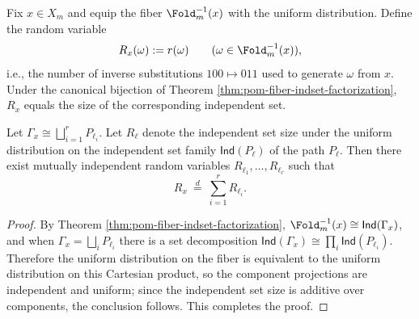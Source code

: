 \begin{definition}\label{def:pom-fiber-rewrite-rv}
Fix \(x\in X_m\) and equip the fiber \(\Fold_m^{-1}(x)\) with the uniform distribution.
Define the random variable
\[
R_x(\omega):=r(\omega)\qquad(\omega\in\Fold_m^{-1}(x)),
\]
i.e., the number of inverse substitutions \(100\mapsto 011\) used to generate \(\omega\) from \(x\).
Under the canonical bijection of Theorem \ref{thm:pom-fiber-indset-factorization}, \(R_x\) equals the size of the corresponding independent set.
\end{definition}

\begin{proposition}\label{prop:pom-fiber-rewrite-independent-sum}
Let \(\Gamma_x\cong\bigsqcup_{i=1}^r P_{\ell_i}\).
Let \(R_{\ell}\) denote the independent set size under the uniform distribution on the independent set family \(\mathsf{Ind}(P_{\ell})\) of the path \(P_{\ell}\).
Then there exist mutually independent random variables \(R_{\ell_1},\dots,R_{\ell_r}\) such that
\[
R_x\ \overset{d}{=}\ \sum_{i=1}^r R_{\ell_i}.
\]
\end{proposition}
\begin{proof}
By Theorem \ref{thm:pom-fiber-indset-factorization},
\(
\Fold_m^{-1}(x)\cong \mathsf{Ind}(\Gamma_x)
\),
and when \(\Gamma_x=\bigsqcup_i P_{\ell_i}\) there is a set decomposition
\(
\mathsf{Ind}(\Gamma_x)\cong \prod_i \mathsf{Ind}(P_{\ell_i})
\).
Therefore the uniform distribution on the fiber is equivalent to the uniform distribution on this Cartesian product, so the component projections are independent and uniform;
since the independent set size is additive over components, the conclusion follows. This completes the proof.
\end{proof}

